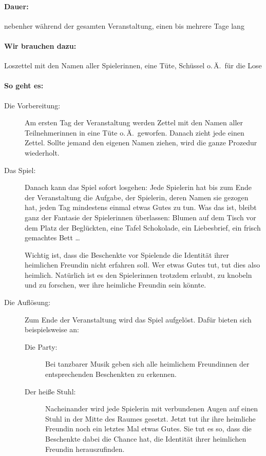\paragraph{Dauer:} nebenher während der gesamten Veranstaltung, einen bis mehrere Tage lang
\paragraph{Wir brauchen dazu:}  Loszettel mit den Namen aller Spielerinnen, eine Tüte, Schüssel o.\,Ä.~für die Lose
\paragraph{So geht es:}
\begin{description}
\item[Die Vorbereitung:] Am ersten Tag der Veranstaltung werden Zettel mit den Namen aller Teilnehmerinnen in eine Tüte o.\,Ä.~geworfen. Danach zieht jede einen Zettel. Sollte jemand den eigenen Namen ziehen, wird die ganze Prozedur wiederholt.

\item[Das Spiel:] Danach kann das Spiel sofort losgehen: Jede Spielerin hat bis zum Ende der Veranstaltung die Aufgabe, der Spielerin, deren Namen sie gezogen hat, jeden Tag mindestens einmal etwas Gutes zu tun. Was das ist, bleibt ganz der Fantasie der Spielerinnen überlassen: Blumen auf dem Tisch vor dem Platz der Beglückten, eine Tafel Schokolade, ein Liebesbrief, ein frisch gemachtes Bett \ldots

Wichtig ist, dass die Beschenkte vor Spielende die Identität ihrer heimlichen Freundin nicht erfahren soll. Wer etwas Gutes tut, tut dies also heimlich. Natürlich ist es den Spielerinnen trotzdem erlaubt, zu knobeln und zu forschen, wer ihre heimliche Freundin sein könnte.

\item[Die Auflösung:] Zum Ende der Veranstaltung wird das Spiel aufgelöst. Dafür bieten sich beispielsweise an:
	\begin{description}
		\item[Die Party:] Bei tanzbarer Musik geben sich alle heimlichem Freundinnen der entsprechenden Beschenkten zu erkennen.
		\item[Der heiße Stuhl:] Nacheinander wird jede Spielerin mit verbundenen Augen auf einen Stuhl in der Mitte des Raumes gesetzt. Jetzt tut ihr ihre heimliche Freundin noch ein letztes Mal etwas Gutes. Sie tut es so, dass die Beschenkte dabei die Chance hat, die Identität ihrer heimlichen Freundin herauszufinden.
	\end{description}
\end{description}


